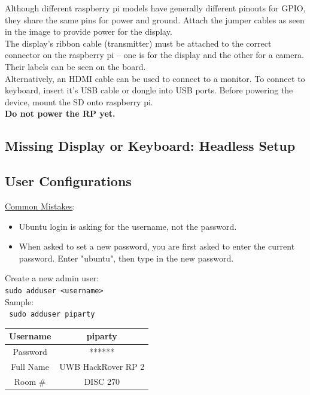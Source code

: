 \documentclass[a4paper, 10pt]{article}
\begin{document}
            \noindent Although different raspberry pi models have generally different pinouts for GPIO, they share the same pins for power and ground. 
            Attach the jumper cables as seen in the image to provide power for the display. \\

            \noindent The display’s ribbon cable (transmitter) must be attached to the correct connector on the raspberry pi – one is for the display and the other for a camera. Their labels can be seen on the board. \\

            \noindent Alternatively, an HDMI cable can be used to connect to a monitor.
            To connect to keyboard, insert it’s USB cable or dongle into USB ports.
            Before powering the device, mount the SD onto raspberry pi. \\
                
            \noindent \textbf{Do not power the RP yet.} 

        \subsection{Missing Display or Keyboard: Headless Setup} 
        

        \subsection{User Configurations}
        \underline{Common Mistakes}:
        \begin{itemize}
            \item Ubuntu login is asking for the username, not the password.
            \item When asked to set a new password, you are first asked to enter the current password. Enter "ubuntu", then type in the new password.
        \end{itemize}
        
        \noindent Create a new admin user:\\
        \texttt{sudo adduser <username>} \\

        \noindent Sample: \\
        \texttt{ sudo adduser piparty} \
        \begin{flushleft}
            \begin{tabular}{|c|c|}
                \hline
                Username & piparty \\
                \hline
                Password & ****** \\
                \hline
                Full Name & UWB HackRover RP 2 \\
                \hline
                Room \# & DISC 270 \\
                \hline
            \end{tabular}
        \end{flushleft} 
\end{document}
